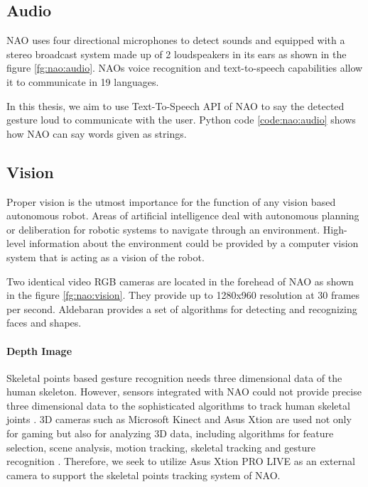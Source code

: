  \label{code:nao:motion}

\subsection{Audio} NAO uses four directional microphones to detect sounds and equipped with a stereo broadcast system made up of 2 loudspeakers in its ears as shown in the figure \ref{fg:nao:audio}. NAOs voice recognition and text-to-speech capabilities allow it to communicate in 19 languages. 

 

In this thesis, we aim to use Text-To-Speech API of NAO to say the detected gesture loud to communicate with the user. Python code \ref{code:nao:audio} shows how NAO can say words given as strings.

 \label{code:nao:audio}



\subsection{Vision} \label{sec:nao:vision} Proper vision is the utmost importance for the function of any vision based autonomous robot. Areas of artificial intelligence deal with autonomous planning or deliberation for robotic systems to navigate through an environment. High-level information about the environment could be provided by a computer vision system that is acting as a vision of the robot.

Two identical video RGB cameras are located in the forehead of NAO as shown in the figure \ref{fg:nao:vision}. They provide up to 1280x960 resolution at 30 frames per second. Aldebaran provides a set of algorithms for detecting and recognizing faces and shapes.

\paragraph*{Depth Image} Skeletal points based gesture recognition needs three dimensional data of the human skeleton. However, sensors integrated with NAO could not provide precise three dimensional data to the sophisticated algorithms to track human skeletal joints \cite{17}. 3D cameras such as Microsoft Kinect and Asus Xtion are used not only for gaming but also for analyzing 3D data, including algorithms for feature selection, scene analysis, motion tracking, skeletal tracking and gesture recognition \cite{9} \cite{18}. Therefore, we seek to utilize Asus Xtion PRO LIVE as an external camera to support the skeletal points tracking system of NAO. 

